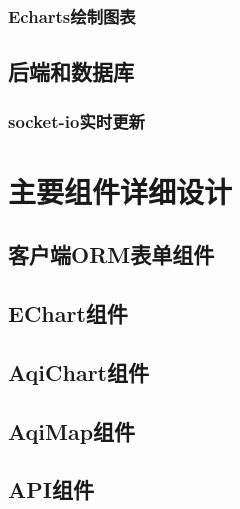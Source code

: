 \subsubsection{Echarts绘制图表}
\subsection{后端和数据库}
\subsubsection{socket-io实时更新}
\section{主要组件详细设计}
\subsection{客户端ORM表单组件}
\subsection{EChart组件}
\subsection{AqiChart组件}
\subsection{AqiMap组件}
\subsection{API组件}
